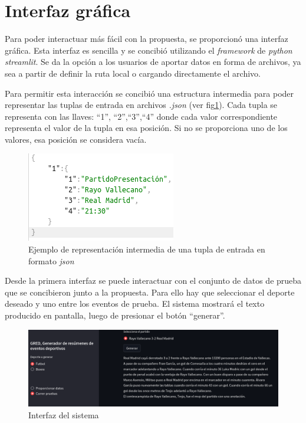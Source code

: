 \section{Interfaz gráfica}

Para poder interactuar más fácil con la propuesta, se proporcionó una interfaz gráfica. Esta interfaz es sencilla
y se concibió utilizando el \emph{framework} de \textit{python streamlit}. Se da la opción a los usuarios de aportar
 datos en forma de archivos, ya sea a partir de definir la ruta local o cargando directamente el archivo.

 Para permitir  esta interacción se concibió una estructura intermedia para poder representar las tuplas 
de entrada en archivos \textit{.json} (ver fig\ref{fig_jsonexample}). Cada tupla se representa con las llaves: “1”, “2”,“3”,“4”
donde cada valor correspondiente representa el valor de la tupla en esa posición. Si no se proporciona uno de los 
valores, esa posición se considera vacía.

    \begin{figure}[!]
        \begin{center}
            \includegraphics[scale=0.6]{Graphics/jsonexample.png}
        \end{center}
        \caption{Ejemplo de representación intermedia de una tupla de entrada en formato \textit{json}}
        \label{fig_jsonexample}
    \end{figure}

 Desde la primera interfaz se puede interactuar con el conjunto de datos de prueba que se concibieron
junto a la propuesta. Para ello hay que seleccionar el deporte deseado y uno entre los eventos de prueba.
El sistema mostrará el texto producido en pantalla, luego de presionar el botón “generar”.



\begin{figure}[!]
    \begin{center}
        \includegraphics[width=\textwidth]{Graphics/GRED.png}
    \end{center}
    \caption{Interfaz del sistema}
    \label{fig_interfaz}
\end{figure}
